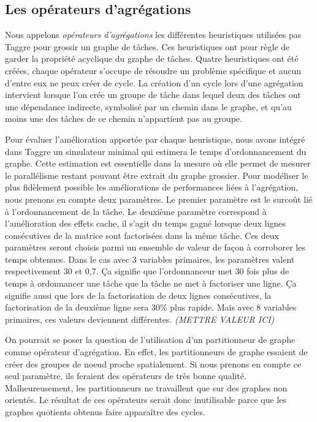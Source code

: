 \subsection{Les opérateurs d'agrégations}
Nous appelons {\em opérateurs d'agrégations} les différentes heuristiques utilisées pas Taggre pour grossir un graphe de tâches.
%
Ces heuristiques ont pour règle de garder la propriété acyclique du graphe de tâches.
%
Quatre heuristiques ont été créées, chaque opérateur s'occupe de résoudre un problème spécifique et aucun d'entre eux ne peux créer de cycle.
%
La création d'un cycle lors d'une agrégation intervient lorsque l'on crée un groupe de tâche dans lequel deux des tâches ont une dépendance indirecte, symbolisé par un chemin dans le graphe, et qu'au moins une des tâches de ce chemin n'appartient pas au groupe.


Pour évaluer l'amélioration apportée par chaque heuristique, nous avons intégré dans Taggre un simulateur minimal qui estimera le temps d'ordonnancement du graphe.
%
Cette estimation est essentielle dans la mesure où elle permet de mesurer le parallélisme restant pouvant être extrait du graphe grossier.
%
Pour modéliser le plus fidèlement possible les améliorations de performances liées à l'agrégation, nous prenons en compte deux paramètres.
%
Le premier paramètre est le surcoût lié à l'ordonnancement de la tâche.
%
Le deuxième paramètre correspond à l'amélioration des effets cache, il s'agit du temps gagné lorsque deux lignes consécutives de la matrice sont factorisées dans la même tâche.
%
Ces deux paramètres seront choisis parmi un ensemble de valeur de façon à corroborer les temps obtenues.
%
Dans le cas avec 3 variables primaires, les paramètres valent respectivement 30 et 0,7.
%
Ça signifie que l'ordonnanceur met 30 fois plus de temps à ordonnancer une tâche que la tâche ne met à factoriser une ligne.
%
Ça signifie aussi que lors de la factorisation de deux lignes consécutives, la factorisation de la deuxième ligne sera 30\% plus rapide.
%
Mais avec 8 variables primaires, ces valeurs deviennent différentes. {\em (METTRE VALEUR ICI)}%


On pourrait se poser la question de l'utilisation d'un partitionneur de graphe comme opérateur d'agrégation.
%
En effet, les partitionneurs de graphe essaient de créer des groupes de noeud proche spatialement.
%
Si nous prenons en compte ce seul paramètre, ils feraient des opérateurs de très bonne qualité.
%
Malheureusement, les partitionneurs ne travaillent que sur des graphes non orientés.
%
Le résultat de ces opérateurs serait donc inutilisable parce que les graphes quotients obtenus faire apparaître des cycles.
